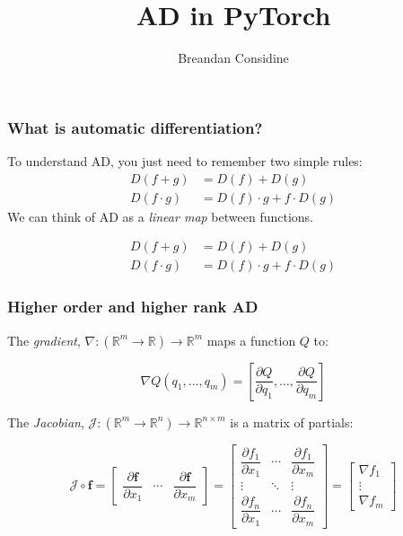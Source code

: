 \documentclass{beamer}
\title{AD in PyTorch}
\author{Breandan Considine}
\begin{document}
    \frame{\titlepage}


    \begin{frame}
        \frametitle{What is automatic differentiation?}
        To understand AD, you just need to remember two simple rules:
        \begin{align*}
            D(f + g) &= D(f) + D(g) \\
            D(f \cdot g) &= D(f) \cdot g + f \cdot D(g)
        \end{align*}
        We can think of AD as a \textit{linear map} between functions.

        \begin{align*}
            D(f + g) &= D(f) + D(g) \\
            D(f \cdot g) &= D(f) \cdot g + f \cdot D(g)
        \end{align*}
    \end{frame}


    \begin{frame}
        \frametitle{Higher order and higher rank AD}

        The \textit{gradient}, $\nabla: (\mathbb{R}^m\rightarrow\mathbb{R})\rightarrow\mathbb{R}^m$ maps a function $Q$ to:

        \begin{equation*}
            \nabla Q(q_1, \dots, q_m) = \left[ \frac{\partial Q}{\partial q_1}, \dots, \frac{\partial Q}{\partial q_m}\right]
        \end{equation*}

        The \textit{Jacobian}, $\mathcal{J}: (\mathbb{R}^m\rightarrow\mathbb{R}^n)\rightarrow\mathbb{R}^{n \times m}$ is a matrix of partials:

        \begin{equation*}
            \mathcal{J}\circ\mathbf{f} =
            \begin{bmatrix}
                \dfrac{\partial \mathbf{f}}{\partial x_1} & \cdots & \dfrac{\partial \mathbf{f}}{\partial x_m}
            \end{bmatrix} =
            \begin{bmatrix}
                \dfrac{\partial f_1}{\partial x_1} & \cdots & \dfrac{\partial f_1}{\partial x_m}\\
                \vdots & \ddots & \vdots\\
                \dfrac{\partial f_n}{\partial x_1} & \cdots & \dfrac{\partial f_n}{\partial x_m}
            \end{bmatrix} =
            \begin{bmatrix}
                \nabla f_1 \\
                \vdots \\
                \nabla f_m
            \end{bmatrix}
        \end{equation*}
    \end{frame}
\end{document}
